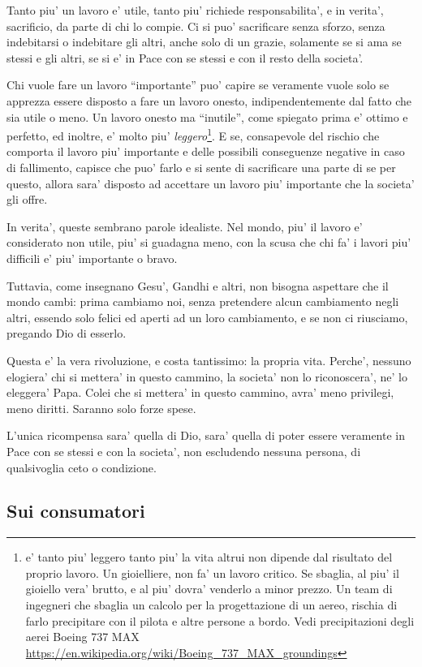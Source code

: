 Tanto piu' un lavoro e' utile, tanto piu' richiede responsabilita', e in verita', sacrificio, da parte di chi lo compie. Ci si puo' sacrificare senza sforzo, senza indebitarsi o indebitare gli altri, anche solo di un grazie, solamente se si ama se stessi e gli altri, se si e' in Pace con se stessi e con il resto della societa'.

Chi vuole fare un lavoro ``importante'' puo' capire se veramente vuole solo se apprezza essere disposto a fare un lavoro onesto, indipendentemente dal fatto che sia utile o meno. Un lavoro onesto ma ``inutile'', come spiegato prima e' ottimo e perfetto, ed inoltre, e' molto piu' \emph{leggero}\footnote{e' tanto piu' leggero tanto piu' la vita altrui non dipende dal risultato del proprio lavoro. Un gioielliere, non fa' un lavoro critico. Se sbaglia, al piu' il gioiello vera' brutto, e al piu' dovra' venderlo a minor prezzo. Un team di ingegneri che sbaglia un calcolo per la progettazione di un aereo, rischia di farlo precipitare con il pilota e altre persone a bordo. Vedi precipitazioni degli aerei Boeing 737 MAX \url{https://en.wikipedia.org/wiki/Boeing\_737\_MAX\_groundings}}. 
E se, consapevole del rischio che comporta il lavoro piu' importante e delle possibili conseguenze negative in caso di fallimento, capisce che puo' farlo e si sente di sacrificare una parte di se per questo, allora sara' disposto ad accettare un lavoro piu' importante che la societa' gli offre.

In verita', queste sembrano parole idealiste. Nel mondo, piu' il lavoro e' considerato non utile, piu' si guadagna meno, con la scusa che chi fa' i lavori piu' difficili e' piu' importante o bravo.

Tuttavia, come insegnano Gesu', Gandhi e altri, non bisogna aspettare che il mondo cambi: prima cambiamo noi, senza pretendere alcun cambiamento negli altri, essendo solo felici ed aperti ad un loro cambiamento, e se non ci riusciamo, pregando Dio di esserlo.

Questa e' la vera rivoluzione, e costa tantissimo: la propria vita. Perche', nessuno elogiera' chi si mettera' in questo cammino, la societa' non lo riconoscera', ne' lo eleggera' Papa. Colei che si mettera' in questo cammino, avra' meno privilegi, meno diritti. Saranno solo forze spese. 

L'unica ricompensa sara' quella di Dio, sara' quella di poter essere veramente in Pace con se stessi e con la societa', non escludendo nessuna persona, di qualsivoglia ceto o condizione.

\subsection{Sui consumatori}

